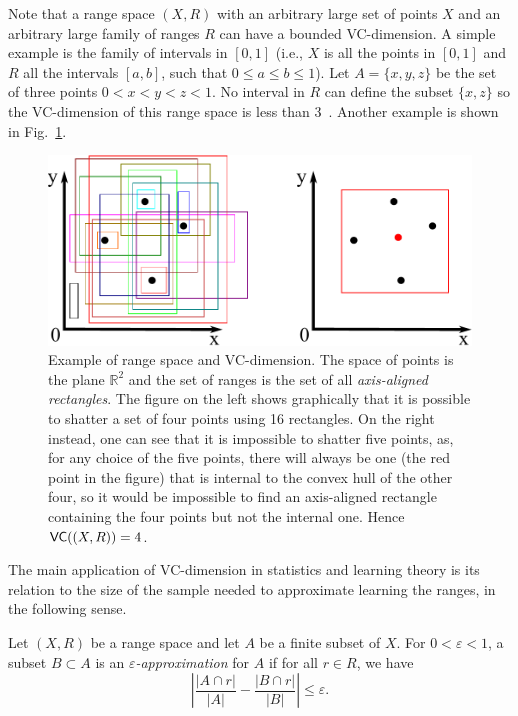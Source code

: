 Note that a range space $(X,R)$ with an arbitrary large set of points $X$ and
an arbitrary large family of ranges $R$ can have a bounded VC-dimension. A simple
example is the family of intervals in $[0,1]$ (i.e., $X$ is all the points in
$[0,1]$ and $R$ all the intervals $[a,b]$, such that $0\leq a\leq b\leq 1$). Let
$A=\{x,y,z\}$ be the set of three points $0<x<y<z<1$. No interval in $R$ can
define the subset $\{x,z\}$ so the VC-dimension of this range space is less than
3~\cite[Lemma 10.3.1]{Matousek02}. Another example is shown in
Fig.~\ref{fig:rectangles}.
\begin{figure}[ht]
  \centering
  \includegraphics[width=.5\textwidth,keepaspectratio]{rectangles}
  \caption{Example of range space and VC-dimension. The space of points is the
  plane $\mathbb{R}^2$ and the set of ranges is the set of all
  \emph{axis-aligned rectangles}. The figure on the left shows graphically that
  it is possible to shatter a set of four points using 16 rectangles. On the
  right instead, one can see that it is impossible to shatter five points, as,
  for any choice of the five points, there will always be one (the red point in
  the figure) that is internal to the convex hull of the other four, so it would
  be impossible to find an axis-aligned rectangle containing the four points
  but not the internal one. Hence $\mathsf{VC}((X,R))=4$.}
  \label{fig:rectangles}
\end{figure}

The main application of VC-dimension in statistics and learning theory is its
relation to the size of the sample needed to approximate learning the ranges, in
the following sense.

\begin{definition}\label{defn:eapprox}
  Let $(X,R)$ be a range space and let $A$
  be a finite subset of $X$. For $0<\varepsilon<1$, a subset $B\subset A$ is an
  $\varepsilon${\em-approximation} for $A$ if for all $r\in R$, we have
      \begin{equation}\label{eq:defeapprox}
	\left|\frac{|A\cap r|}{|A|}-\frac{|B\cap r|}{|B|}\right| \leq
	\varepsilon.
      \end{equation}
\end{definition}

